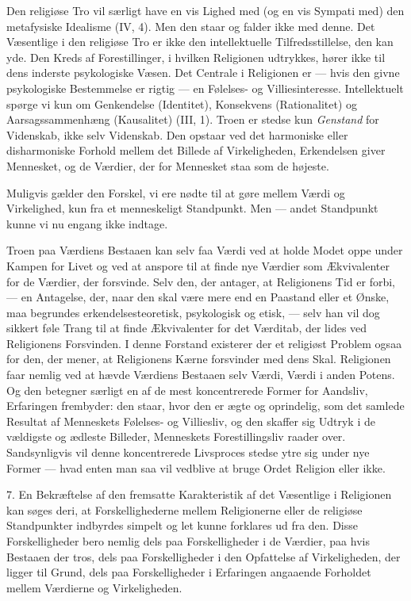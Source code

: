 \documentclass[12pt,a4paper,openany]{book}
\newcommand{\opage}[1]{\marginnote{\footnotesize\textit{[#1]}}}
\begin{document}
Den religiøse Tro vil særligt have en vis Lighed med (og en vis Sympati med)
den metafysiske Idealisme (IV, 4). Men den staar og falder ikke med denne. Det
Væsentlige i den religiøse Tro er ikke den intellektuelle Tilfredsstillelse,
den kan yde. Den Kreds af Forestillinger, i hvilken Religionen udtrykkes, hører
ikke til dens inderste psykologiske Væsen. Det Centrale i Religionen er ---
hvis den givne psykologiske Bestemmelse er rigtig --- en Følelses- og
Villiesinteresse. Intellektuelt spørge vi kun om Genkendelse (Identitet),
Konsekvens (Rationalitet) og Aarsagssammenhæng (Kausalitet) (III, 1). Troen er
stedse kun \textit{Genstand} for Videnskab, ikke selv Videnskab. Den opstaar
ved det harmoniske eller disharmoniske Forhold mellem det Billede af
Virkeligheden, Erkendelsen giver Mennesket, og de Værdier, der for Mennesket
staa som de højeste.

Muligvis gælder den Forskel, vi ere nødte til at gøre mellem Værdi og
Virkelighed, kun fra et menneskeligt Standpunkt. Men --- andet Standpunkt kunne
vi nu engang ikke indtage.

Troen paa Værdiens Bestaaen kan selv faa Værdi ved at holde Modet oppe under
Kampen for Livet og ved at anspore til at finde nye Værdier som Ækvivalenter
for de Værdier, der forsvinde. Selv den, der antager, at Religionens Tid er
forbi, --- en Antagelse, der, naar den skal være mere end en Paastand eller et
Ønske, maa begrundes erkendelsesteoretisk, psykologisk og etisk, --- selv han
vil dog sikkert føle Trang til at finde Ækvivalenter for det Værditab, der
lides ved Religionens Forsvinden. I denne Forstand existerer der et religiøst Problem
\opage{82}ogsaa for den, der mener, at Religionens Kærne forsvinder med dens
Skal. Religionen faar nemlig ved at hævde Værdiens Bestaaen selv Værdi, Værdi i
anden Potens. Og den betegner særligt en af de mest koncentrerede Former for
Aandsliv, Erfaringen frembyder: den staar, hvor den er ægte og oprindelig, som
det samlede Resultat af Menneskets Følelses- og Villiesliv, og den skaffer sig
Udtryk i de vældigste og ædleste Billeder, Menneskets Forestillingsliv raader
over. Sandsynligvis vil denne koncentrerede Livsproces stedse ytre sig under
nye Former --- hvad enten man saa vil vedblive at bruge Ordet Religion eller ikke.

7. En Bekræftelse af den fremsatte Karakteristik af det Væsentlige i Religionen
kan søges deri, at Forskellighederne mellem Religionerne eller de religiøse
Standpunkter indbyrdes simpelt og let kunne forklares ud fra den. Disse
Forskelligheder bero nemlig dels paa Forskelligheder i de Værdier, paa hvis
Bestaaen der tros, dels paa Forskelligheder i den Opfattelse af Virkeligheden,
der ligger til Grund, dels paa Forskelligheder i Erfaringen angaaende Forholdet
mellem Værdierne og Virkeligheden.
\end{document}
